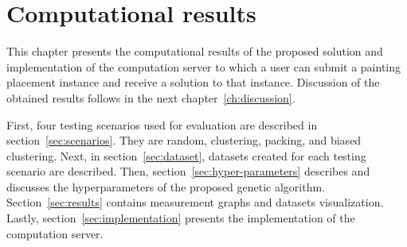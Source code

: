 \chapter{Computational results}\label{ch:computational-results}

This chapter presents the computational results of the proposed solution
and implementation of the computation server
to which a user can submit a painting placement instance
and receive a solution to that instance.
Discussion of the obtained results follows in the next chapter~\ref{ch:discussion}.

First, four testing scenarios used for evaluation are described in
section~\ref{sec:scenarios}.
They are random, clustering, packing, and biased clustering.
Next, in section~\ref{sec:dataset}, datasets created for each testing scenario are described.
Then, section~\ref{sec:hyper-parameters} describes and discusses
the hyperparameters of the proposed genetic algorithm.
Section~\ref{sec:results} contains measurement graphs and datasets visualization.
Lastly, section~\ref{sec:implementation} presents the implementation of the computation server.






